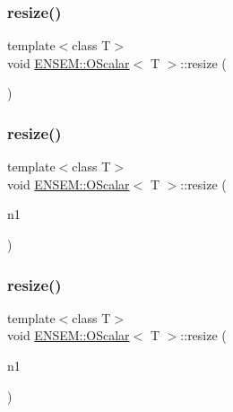 \mbox{\label{classENSEM_1_1OScalar_ab7d5b96a7f1a3451bedd04eda3169c84}} 
\subsubsection{\texorpdfstring{resize()}{resize()}\hspace{0.1cm}{\footnotesize\ttfamily [2/4]}}
{\footnotesize\ttfamily template$<$class T$>$ \\
void \mbox{\hyperlink{classENSEM_1_1OScalar}{E\+N\+S\+E\+M\+::\+O\+Scalar}}$<$ T $>$\+::resize (\begin{DoxyParamCaption}\item[{const \mbox{\hyperlink{classENSEM_1_1OScalar}{O\+Scalar}}$<$ T $>$ \&}]{ }\end{DoxyParamCaption})\hspace{0.3cm}{\ttfamily [inline]}}

\mbox{\label{classENSEM_1_1OScalar_ab8b1ad6566b12cb3036794b47bb0ae8d}} 
\subsubsection{\texorpdfstring{resize()}{resize()}\hspace{0.1cm}{\footnotesize\ttfamily [3/4]}}
{\footnotesize\ttfamily template$<$class T$>$ \\
void \mbox{\hyperlink{classENSEM_1_1OScalar}{E\+N\+S\+E\+M\+::\+O\+Scalar}}$<$ T $>$\+::resize (\begin{DoxyParamCaption}\item[{int}]{n1 }\end{DoxyParamCaption})\hspace{0.3cm}{\ttfamily [inline]}}

\mbox{\label{classENSEM_1_1OScalar_ab8b1ad6566b12cb3036794b47bb0ae8d}} 
\subsubsection{\texorpdfstring{resize()}{resize()}\hspace{0.1cm}{\footnotesize\ttfamily [4/4]}}
{\footnotesize\ttfamily template$<$class T$>$ \\
void \mbox{\hyperlink{classENSEM_1_1OScalar}{E\+N\+S\+E\+M\+::\+O\+Scalar}}$<$ T $>$\+::resize (\begin{DoxyParamCaption}\item[{int}]{n1 }\end{DoxyParamCaption})\hspace{0.3cm}{\ttfamily [inline]}}

